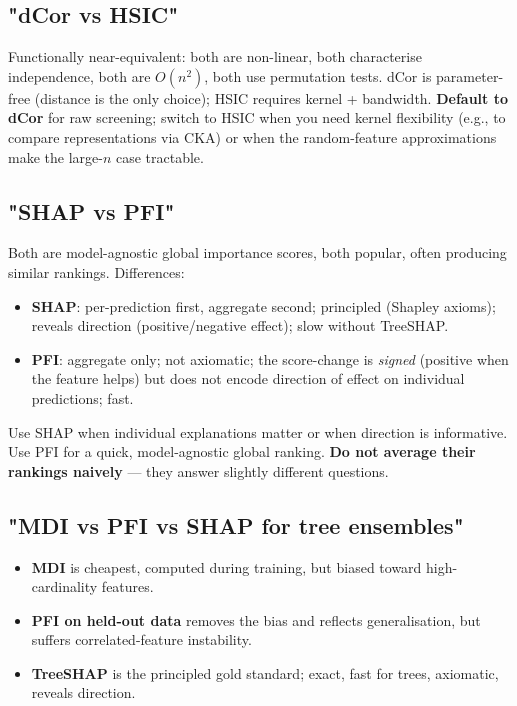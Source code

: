 \documentclass{article}
\providecommand{\tightlist}{\setlength{\itemsep}{0pt}\setlength{\parskip}{0pt}}
\begin{document}
\subsection{"dCor vs HSIC"}\label{dcor-vs-hsic}

Functionally near-equivalent: both are non-linear, both characterise
independence, both are \(O(n^2)\), both use permutation tests. dCor is
parameter-free (distance is the only choice); HSIC requires kernel +
bandwidth. \textbf{Default to dCor} for raw screening; switch to HSIC
when you need kernel flexibility (e.g., to compare representations via
CKA) or when the random-feature approximations make the large-\(n\) case
tractable.

\subsection{"SHAP vs PFI"}\label{shap-vs-pfi}

Both are model-agnostic global importance scores, both popular, often
producing similar rankings. Differences:

\begin{itemize}
\tightlist
\item
  \textbf{SHAP}: per-prediction first, aggregate second; principled
  (Shapley axioms); reveals direction (positive/negative effect); slow
  without TreeSHAP.
\item
  \textbf{PFI}: aggregate only; not axiomatic; the score-change is
  \emph{signed} (positive when the feature helps) but does not encode
  direction of effect on individual predictions; fast.
\end{itemize}

Use SHAP when individual explanations matter or when direction is
informative. Use PFI for a quick, model-agnostic global ranking.
\textbf{Do not average their rankings naively} --- they answer slightly
different questions.

\subsection{"MDI vs PFI vs SHAP for tree
ensembles"}\label{mdi-vs-pfi-vs-shap-for-tree-ensembles}

\begin{itemize}
\tightlist
\item
  \textbf{MDI} is cheapest, computed during training, but biased toward
  high-cardinality features.
\item
  \textbf{PFI on held-out data} removes the bias and reflects
  generalisation, but suffers correlated-feature instability.
\item
  \textbf{TreeSHAP} is the principled gold standard; exact, fast for
  trees, axiomatic, reveals direction.
\end{itemize}
\end{document}
